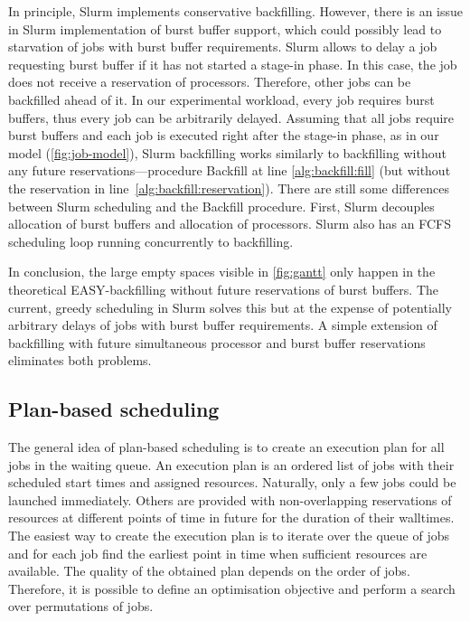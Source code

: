 \documentclass[runningheads]{llncs}
\newcommand\fixme[1]{
	\textcolor{blue}{{{\em\bf{[{\sc{{Fixme:}}} #1]}}}}
	}
\begin{document}
In principle, Slurm implements conservative backfilling. However, there is an issue in Slurm implementation of burst buffer support, which could possibly lead to starvation of jobs with burst buffer requirements. %
Slurm allows to delay a job requesting burst buffer if it has not started a stage-in phase. In this case, the job does not receive a reservation of processors. Therefore, other jobs can be backfilled ahead of it. In our experimental workload, every job requires burst buffers, thus every job can be arbitrarily delayed. %
Assuming that all jobs require burst buffers and each job is executed right after the stage-in phase, as in our model (\cref{fig:job-model}),
Slurm backfilling works similarly to backfilling without any future reservations---procedure Backfill at line \ref{alg:backfill:fill} (but without the reservation in line~\ref{alg:backfill:reservation}).
There are still some differences between Slurm scheduling and the Backfill procedure. First, Slurm decouples allocation of burst buffers and allocation of processors. Slurm also has an FCFS scheduling loop running concurrently to backfilling.

In conclusion, the large empty spaces visible in \cref{fig:gantt} only happen in the theoretical EASY-backfilling without future reservations of burst buffers. The current, greedy scheduling in Slurm solves this but at the expense of potentially arbitrary delays of jobs with burst buffer requirements. A simple extension of backfilling with future simultaneous processor and burst buffer reservations eliminates both problems.

\subsection{Plan-based scheduling} \label{sec:algorithm-plan}
The general idea of plan-based scheduling is to create an execution plan for all jobs in the waiting queue. An execution plan is an ordered list of jobs with their scheduled start times and assigned resources. Naturally, only a few jobs could be launched immediately. Others are provided with non-overlapping reservations of resources at different points of time in future for the duration of their walltimes. The easiest way to create the execution plan is to iterate over the queue of jobs and for each job find the earliest point in time when sufficient resources are available. The quality of the obtained plan depends on the order of jobs. Therefore, it is possible to define an optimisation objective and perform a search over permutations of jobs.
\end{document}
